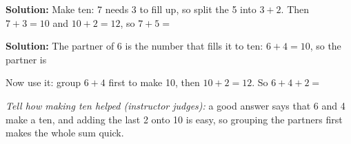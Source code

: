 \documentclass[12pt]{article}
\begin{document}

\textbf{Solution:} Make ten: 7 needs 3 to fill up, so split the 5 into
$3+2$. Then $7+3=10$ and $10+2=12$, so $7+5=\;$


\textbf{Solution:} The partner of 6 is the number that fills it to ten:
$6+4=10$, so the partner is 

Now use it: group $6+4$ first to make 10, then $10+2=12$. So
$6+4+2=\;$

\emph{Tell how making ten helped (instructor judges):} a good answer says
that 6 and 4 make a ten, and adding the last 2 onto 10 is easy, so grouping
the partners first makes the whole sum quick.
\end{document}
